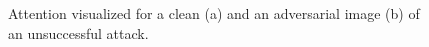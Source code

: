 \begin{figure}[H]
    \centering
    \vspace{\floatsep}
    \caption{Attention visualized for a clean (a) and an adversarial image (b) of an unsuccessful attack.}
    \label{adv_example_caption_tennis}
\end{figure}


